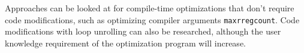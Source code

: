 \documentclass[twocolumn]{IEEEtran}
\begin{document}
Approaches can be looked at for compile-time optimizations that don’t require code modifications, such as optimizing compiler arguments \texttt{maxrregcount}. Code modifications with loop unrolling can also be researched, although the user knowledge requirement of the optimization program will increase.

\newpage

\nocite*{}
\end{document}
